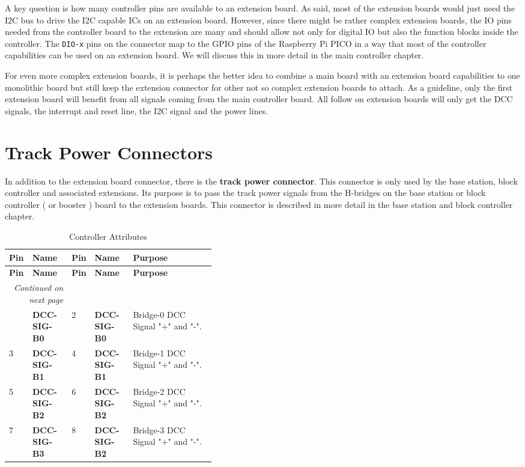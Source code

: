 A key question is how many controller pins are available to an extension board. As said, most of the extension boards would just need the I2C bus to drive the I2C capable ICs on an extension board. However, since there might be rather complex extension boards, the IO pins needed from the controller board to the extension are many and should allow not only for digital IO but also the function blocks inside the controller. The \texttt{DIO-x} pins on the connector map to the GPIO pins of the Raspberry Pi PICO in a way that most of the controller capabilities can be used on an extension board. We will discuss this in more detail in the main controller chapter.

For even more complex extension boards, it is perhaps the better idea to combine a main board with an extension board capabilities to one monolithic board but still keep the extension connector for other not so complex extension boards to attach. As a guideline, only the first extension board will benefit from all signals coming from the main controller board. All follow on extension boards will only get the DCC signals, the interrupt and reset line, the I2C signal and the power lines.

\section{Track Power Connectors}

In addition to the extension board connector, there is the \textbf{track power connector}. This connector is only used by the base station, block controller and associated extensions. Its purpose is to pass the track power signals from the H-bridges on the base station or block controller ( or booster ) board to the extension boards. This connector is described in more detail in the base station and block controller chapter.

\begin{longtable}{@{}|l|l|l|l|p{0.4\linewidth}|@{}}
    \caption{Controller Attributes} \\
    \toprule
    \textbf{Pin} & \textbf{Name} & \textbf{Pin} & \textbf{Name}& \textbf{Purpose}\\
    \midrule
    \endfirsthead
    \toprule
    \textbf{Pin} & \textbf{Name} & \textbf{Pin} & \textbf{Name}& \textbf{Purpose}\\
    \midrule
    \endhead
    \midrule
    \multicolumn{2}{r}{\textit{Continued on next page}} \\
    \midrule
    \endfoot
    \bottomrule
    \endlastfoot
    1 & \textbf{DCC-SIG-B0} & 2 & \textbf{DCC-SIG-B0} & Bridge-0 DCC Signal "+" and "-". \\
    \midrule
    3 & \textbf{DCC-SIG-B1} & 4 & \textbf{DCC-SIG-B1} & Bridge-1 DCC Signal "+" and "-". \\
    \midrule
    5 & \textbf{DCC-SIG-B2} & 6 & \textbf{DCC-SIG-B2} & Bridge-2 DCC Signal "+" and "-". \\
    \midrule
    7 & \textbf{DCC-SIG-B3} & 8 & \textbf{DCC-SIG-B2} & Bridge-3 DCC Signal "+" and "-". \\
\end{longtable} 

